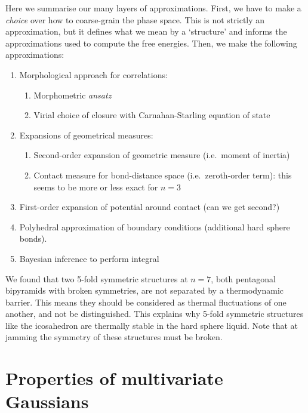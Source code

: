 \documentclass[11pt,twoside]{report}
\begin{document}
Here we summarise our many layers of approximations.
First, we have to make a \emph{choice} over how to coarse-grain the phase space.
This is not strictly an approximation, but it defines what we mean by a `structure' and informs the approximations used to compute the free energies.
Then, we make the following approximations:
\begin{enumerate}
\item Morphological approach for correlations:
  \begin{enumerate}
  \item Morphometric \emph{ansatz}
  \item Virial choice of closure with Carnahan-Starling equation of state
  \end{enumerate}
\item Expansions of geometrical measures:
  \begin{enumerate}
  \item Second-order expansion of geometric measure (i.e.\ moment of inertia)
  \item Contact measure for bond-distance space (i.e.\ zeroth-order term): this seems to be more or less exact for $n=3$
  \end{enumerate}
\item First-order expansion of potential around contact (can we get second?)
\item Polyhedral approximation of boundary conditions (additional hard sphere bonds).
\item Bayesian inference to perform integral
\end{enumerate}

We found that two 5-fold symmetric structures at $n=7$, both pentagonal bipyramids with broken symmetries, are not separated by a thermodynamic barrier.
This means they should be considered as thermal fluctuations of one another, and not be distinguished.
This explains why 5-fold symmetric structures like the icosahedron are thermally stable in the hard sphere liquid.
Note that at jamming the symmetry of these structures must be broken.

\section{Properties of multivariate Gaussians}
\end{document}
